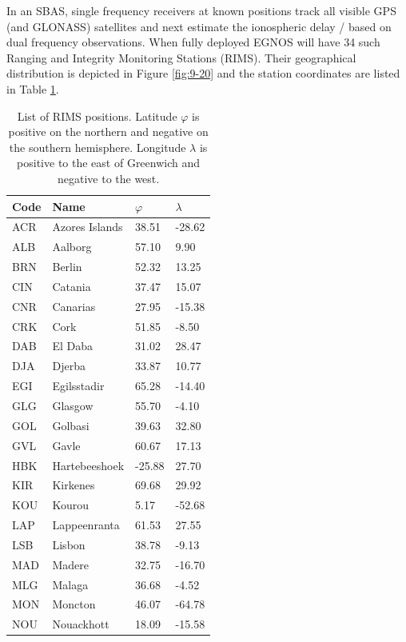 		In an SBAS, single frequency receivers at known positions track all visible GPS (and GLONASS) satellites and next estimate the ionospheric delay / based on dual frequency observations. When fully deployed EGNOS will have 34 such Ranging and Integrity Monitoring Stations (RIMS). Their geographical distribution is depicted in Figure \ref{fig:9-20} and the station coordinates are listed in Table \ref{tab:9.7}.
		\begin{table}
			\centering
			\caption{List of RIMS positions. Latitude $\varphi$ is positive on the northern and negative on the southern hemisphere. Longitude $\lambda$ is positive to the east of Greenwich and negative to the west.}
			\label{tab:9.7}
			\begin{tabular}{llll}			
				\hline Code & Name & $\varphi$ & $\lambda$ \\ 
				\hline ACR	& Azores Islands & 38.51 & -28.62 \\
					   ALB  & Aalborg & 57.10 & 9.90 \\
					   BRN	& Berlin & 52.32 & 13.25 \\
					   CIN 	& Catania & 37.47 & 15.07 \\
					   CNR 	& Canarias & 27.95 & -15.38 \\
					   CRK 	& Cork & 51.85 & -8.50 \\
					   DAB 	& El Daba & 31.02 & 28.47 \\
					   DJA 	& Djerba & 33.87 & 10.77 \\
					   EGI 	& Egilsstadir & 65.28 & -14.40 \\
					   GLG  & Glasgow & 55.70 & -4.10 \\
					   GOL  & Golbasi & 39.63 & 32.80 \\
					   GVL  & Gavle & 60.67 & 17.13 \\
					   HBK  & Hartebeeshoek & -25.88 & 27.70 \\
					   KIR  & Kirkenes & 69.68 & 29.92 \\
					   KOU  & Kourou & 5.17 & -52.68 \\
					   LAP  & Lappeenranta & 61.53 & 27.55 \\
					   LSB  & Lisbon & 38.78 & -9.13 \\
					   MAD  & Madere & 32.75 & -16.70 \\
					   MLG  & Malaga & 36.68 & -4.52 \\
					   MON  & Moncton & 46.07 & -64.78 \\
					   NOU  & Nouackhott & 18.09 & -15.58 \\

\end{tabular}
\end{table}
